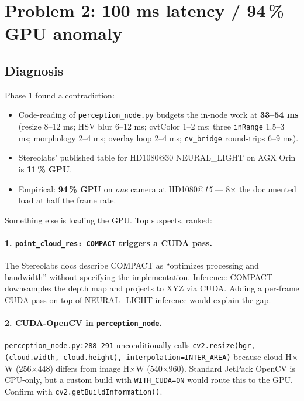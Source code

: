 \documentclass[11pt]{article}
\begin{document}
\section{Problem 2: 100 ms latency / 94\,\% GPU anomaly}

\subsection{Diagnosis}

Phase 1 found a contradiction:

\begin{itemize}[leftmargin=2em,nosep]
\item Code-reading of \texttt{perception\_node.py} budgets the in-node work at
  \textbf{33--54 ms} (resize 8--12 ms; HSV blur 6--12 ms; cvtColor 1--2 ms;
  three \texttt{inRange} 1.5--3 ms; morphology 2--4 ms; overlay loop 2--4 ms;
  \texttt{cv\_bridge} round-trips 6--9 ms).
\item Stereolabs' published table for HD1080@30 NEURAL\_LIGHT on AGX Orin
  is \textbf{11\,\% GPU}.
\item Empirical: \textbf{94\,\% GPU} on \emph{one} camera at HD1080@\emph{15}
  --- 8$\times$ the documented load at half the frame rate.
\end{itemize}

Something else is loading the GPU. Top suspects, ranked:

\paragraph{1. \texttt{point\_cloud\_res: COMPACT} triggers a CUDA pass.}
The Stereolabs docs describe COMPACT as ``optimizes processing and bandwidth''
without specifying the implementation. Inference: COMPACT downsamples the
depth map and projects to XYZ via CUDA. Adding a per-frame CUDA pass on top
of NEURAL\_LIGHT inference would explain the gap.

\paragraph{2. CUDA-OpenCV in \texttt{perception\_node}.}
\texttt{perception\_node.py:288--291} unconditionally calls
\texttt{cv2.resize(bgr, (cloud.width, cloud.height), interpolation=INTER\_AREA)}
because cloud H$\times$W (256$\times$448) differs from image H$\times$W
(540$\times$960). Standard JetPack OpenCV is CPU-only, but a custom build
with \texttt{WITH\_CUDA=ON} would route this to the GPU. Confirm with
\texttt{cv2.getBuildInformation()}.
\end{document}
